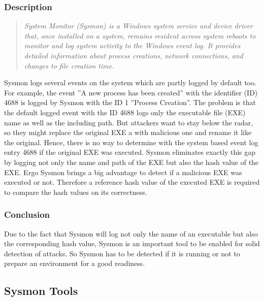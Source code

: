 \subsubsection{Description}
\begin{quotation}
    \textit{System Monitor (Sysmon) is a Windows system service and device driver that, once installed on a system, remains resident across system reboots to monitor and log system activity to the Windows event log. It provides detailed information about process creations, network connections, and changes to file creation time.\cite{Sysmon}}
\end{quotation}
Sysmon logs several events on the system which are partly logged by default too. For example, the event ''A new process has been created'' with the identifier (ID) 4688 is logged by Sysmon with the ID 1 ''Process Creation''. The problem is that the default logged event with the ID 4688 logs only the executable file (EXE) name as well as the including path. But attackers want to stay below the radar, so they might replace the original EXE a with malicious one and rename it like the original. Hence, there is no way to determine with the system based event log entry 4688 if the original EXE was executed. Sysmon eliminates exactly this gap by logging not only the name and path of the EXE but also the hash value of the EXE. Ergo Sysmon brings a big advantage to detect if a malicious EXE was executed or not. Therefore a reference hash value of the executed EXE is required to compare the hash values on its correctness. \cite{Sysmon1}

\subsubsection{Conclusion}
Due to the fact that Sysmon will log not only the name of an executable but also the corresponding hash value, Sysmon is an important tool to be enabled for solid detection of attacks. So Sysmon has to be detected if it is running or not to prepare an environment for a good readiness.


\subsection{Sysmon Tools}
